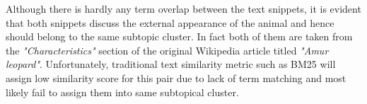 Although there is hardly any term overlap between the text snippets, it is evident that both snippets discuss the external appearance of the animal and hence should belong to the same subtopic cluster. In fact both of them are taken from the \textit{"Characteristics"} section of the original Wikipedia article titled \textit{"Amur leopard"}. Unfortunately, traditional text similarity metric such as BM25 will assign low similarity score for this pair due to lack of term matching and most likely fail to assign them into same subtopical cluster.





